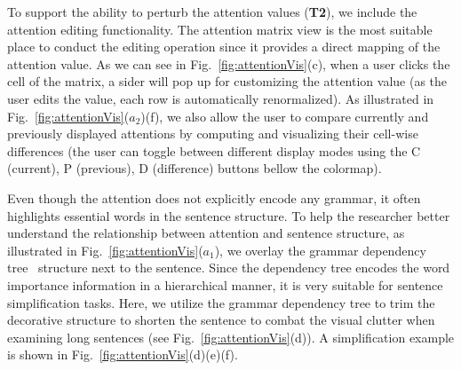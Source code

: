 To support the ability to perturb the attention values (\textbf{T2}), we include the attention editing functionality. The attention matrix view is the most suitable place to conduct the editing operation since it provides a direct mapping of the attention value.
As we can see in Fig.~\ref{fig:attentionVis}(c), when a user clicks the cell of the matrix, a sider will pop up for customizing the attention value (as the user edits the value, each row is automatically renormalized).
%
As illustrated in Fig.~\ref{fig:attentionVis}($a_{2}$)(f), we also allow the user to compare currently and previously displayed attentions by computing and visualizing their cell-wise differences (the user can toggle between different display modes using the C (current), P (previous), D (difference) buttons bellow the colormap).


Even though the attention does not explicitly encode any grammar, it often highlights essential words in the sentence structure.
%
To help the researcher better understand the relationship between attention and sentence structure, as illustrated in Fig.~\ref{fig:attentionVis}($a_{1}$), we overlay the grammar dependency tree~\cite{Nivre2005} structure next to the sentence.
%
Since the dependency tree encodes the word importance information in a hierarchical manner, it is very suitable for sentence simplification tasks.
Here, we utilize the grammar dependency tree to trim the decorative structure to shorten the sentence to combat the visual clutter when examining long sentences (see Fig.~\ref{fig:attentionVis}(d)). A simplification example is shown in  Fig.~\ref{fig:attentionVis}(d)(e)(f).




